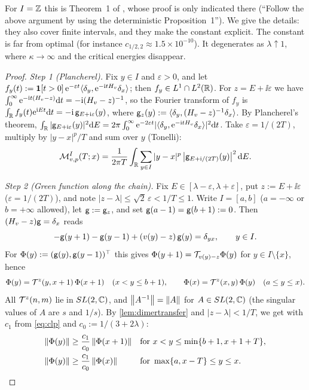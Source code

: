 For $I=\mathbb{Z}$ this is Theorem~1 of \cite{JSBS2003}, whose proof is only indicated there (``Follow the
above argument by using the deterministic Proposition~1'').  We give the details: they also cover
finite intervals, and they make the constant explicit.  The constant is far from optimal (for
instance $c_{1/2,2}\approx1.5\times10^{-10}$).  It degenerates as $\lambda\uparrow1$, where
$\kappa\to\infty$ and the critical energies disappear.

\begin{proof}
\emph{Step 1 (Plancherel).}  Fix $y\in I$ and $\varepsilon>0$, and let
$f_y(t):=\mathbf{1}[t>0]\,\mathrm{e}^{-\varepsilon t}\langle\delta_y,\mathrm{e}^{-\mathrm{i} tH_v}\delta_x\rangle$; then
$f_y\in L^1\cap L^2(\mathbb{R})$.  For $z=E+\ii\varepsilon$ we have
$\int_0^\infty\mathrm{e}^{-\mathrm{i} t(H_v-z)}\mathrm{d} t=-\mathrm{i}(H_v-z)^{-1}$, so the Fourier transform of $f_y$ is
$\int_{\mathbb{R}} f_y(t)\mathrm{e}^{\mathrm{i} Et}\mathrm{d} t=-\mathrm{i}\,\mathsf{g}_{E+\mathrm{i}\varepsilon}(y)$, where
$\mathsf{g}_z(y):=\langle\delta_y,(H_v-z)^{-1}\delta_x\rangle$.  By Plancherel's theorem,
$\int_{\mathbb{R}}|\mathsf{g}_{E+\mathrm{i}\varepsilon}(y)|^2\mathrm{d} E=2\pi\int_0^\infty\mathrm{e}^{-2\varepsilon t}|\langle\delta_y,\mathrm{e}^{-\mathrm{i} tH_v}\delta_x\rangle|^2\mathrm{d} t$.
Take $\varepsilon=1/(2T)$, multiply by $|y-x|^p/T$ and sum over $y$ (Tonelli):
\begin{equation}\label{eq:plancherel}
  \mathcal{M}^I_{v,p}(T;x)=\frac{1}{2\pi T}\int_{\mathbb{R}}\sum_{y\in I}|y-x|^p\,\bigl|\mathsf{g}_{E+\mathrm{i}/(2T)}(y)\bigr|^2\,\mathrm{d} E .
\end{equation}

\emph{Step 2 (Green function along the chain).}  Fix $E\in[\lambda-\varepsilon,\lambda+\varepsilon]$, put
$z:=E+\ii\varepsilon$ ($\varepsilon=1/(2T)$), and note $|z-\lambda|\le\sqrt2\,\varepsilon<1/T\le1$.  Write
$I=[a,b]$ ($a=-\infty$ or $b=+\infty$ allowed), let $\mathsf{g}:=\mathsf{g}_z$, and set $\mathsf{g}(a-1)=\mathsf{g}(b+1):=0$.
Then $(H_v-z)\mathsf{g}=\delta_x$ reads
\[
  -\mathsf{g}(y+1)-\mathsf{g}(y-1)+(v(y)-z)\,\mathsf{g}(y)=\delta_{yx},\qquad y\in I .
\]
For $\Phi(y):=(\mathsf{g}(y),\mathsf{g}(y-1))^\top$ this gives $\Phi(y+1)=\mathcal{T}_{v(y)-z}\Phi(y)$ for
$y\in I\setminus\{x\}$, hence
\[
  \Phi(y)=\mathcal{T}^z(y,x+1)\,\Phi(x+1)\quad(x<y\le b+1),\qquad \Phi(x)=\mathcal{T}^z(x,y)\,\Phi(y)\quad(a\le y\le x).
\]
All $\mathcal{T}^z(n,m)$ lie in $SL(2,\mathbb{C})$, and $\left\|A^{-1}\right\|=\left\|A\right\|$ for $A\in SL(2,\mathbb{C})$ (the singular
values of $A$ are $s$ and $1/s$).  By \cref{lem:dimertransfer} and $|z-\lambda|<1/T$, we get with
$c_1$ from \eqref{eq:clp} and $c_0:=1/(3+2\lambda)$:
\begin{equation}\label{eq:Phiprop}
\begin{aligned}
  \left\|\Phi(y)\right\|&\ge\frac{c_1}{c_0}\left\|\Phi(x+1)\right\|&&\text{for }x<y\le\min\{b+1,x+1+T\},\\
  \left\|\Phi(y)\right\|&\ge\frac{c_1}{c_0}\left\|\Phi(x)\right\|&&\text{for }\max\{a,x-T\}\le y\le x.
\end{aligned}
\end{equation}


\end{proof}
